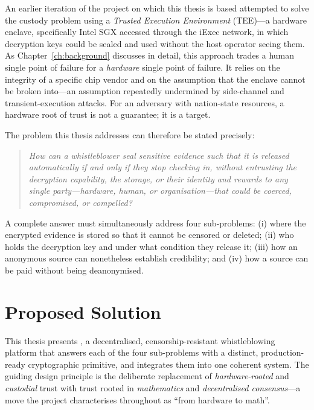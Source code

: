 An earlier iteration of the project on which this thesis is based attempted to
solve the custody problem using a \emph{Trusted Execution Environment} (TEE)---a
hardware enclave, specifically Intel SGX accessed through the iExec network, in
which decryption keys could be sealed and used without the host operator seeing
them. As Chapter~\ref{ch:background} discusses in detail, this approach trades a
human single point of failure for a \emph{hardware} single point of failure. It
relies on the integrity of a specific chip vendor and on the assumption that the
enclave cannot be broken into---an assumption repeatedly undermined by
side-channel and transient-execution attacks. For an adversary with
nation-state resources, a hardware root of trust is not a guarantee; it is a
target.

The problem this thesis addresses can therefore be stated precisely:

\begin{quote}
\emph{How can a whistleblower seal sensitive evidence such that it is released
automatically if and only if they stop checking in, without entrusting the
decryption capability, the storage, or their identity and rewards to any single
party---hardware, human, or organisation---that could be coerced, compromised,
or compelled?}
\end{quote}

A complete answer must simultaneously address four sub-problems: (i) where the
encrypted evidence is stored so that it cannot be censored or deleted; (ii) who
holds the decryption key and under what condition they release it; (iii) how an
anonymous source can nonetheless establish credibility; and (iv) how a source
can be paid without being deanonymised.

\section{Proposed Solution}
\label{sec:intro-solution}

This thesis presents \zkwns, a decentralised, censorship-resistant
whistleblowing platform that answers each of the four sub-problems with a
distinct, production-ready cryptographic primitive, and integrates them into one
coherent system. The guiding design principle is the deliberate replacement of
\emph{hardware-rooted} and \emph{custodial} trust with trust rooted in
\emph{mathematics} and \emph{decentralised consensus}---a move the project
characterises throughout as ``from hardware to math''.

